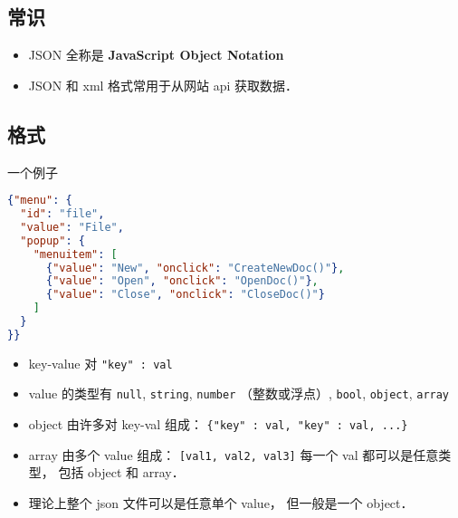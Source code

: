 
\begin{issues}
\issueDraft
\end{issues}

\subsection{常识}
\begin{itemize}
\item JSON 全称是 \textbf{JavaScript Object Notation}
\item JSON 和 xml 格式常用于从网站 api 获取数据．
\end{itemize}

\subsection{格式}
一个例子
\begin{lstlisting}[language=json]
{"menu": {
  "id": "file",
  "value": "File",
  "popup": {
    "menuitem": [
      {"value": "New", "onclick": "CreateNewDoc()"},
      {"value": "Open", "onclick": "OpenDoc()"},
      {"value": "Close", "onclick": "CloseDoc()"}
    ]
  }
}}
\end{lstlisting}

\begin{itemize}
\item key-value 对 \verb|"key" : val|
\item value 的类型有 \verb|null|, \verb|string|, \verb|number| （整数或浮点）, \verb|bool|, \verb|object|, \verb|array|
\item object 由许多对 key-val 组成： \verb|{"key" : val, "key" : val, ...}|
\item array 由多个 value 组成： \verb|[val1, val2, val3]| 每一个 val 都可以是任意类型， 包括 object 和 array．
\item 理论上整个 json 文件可以是任意单个 value， 但一般是一个 object．
\end{itemize}
